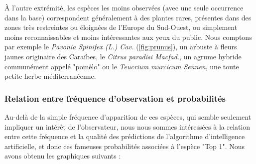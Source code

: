 \documentclass[a4paper,12pt]{article}
\begin{document}
\vspace{0.2cm}

À l'autre extrémité, les espèces les moins observées (avec une seule occurrence dans la base) correspondent généralement à des plantes rares, présentes dans des zones très restreintes ou éloignées de l'Europe du Sud-Ouest, ou simplement moins reconnaissables et moins intéressantes aux yeux du public. Nous comptons par exemple le \textit{Pavonia Spinifex (L.) Cav.} (\autoref{fig:prunus}), un arbuste à fleurs jaunes originaire des Caraïbes, le \textit{Citrus paradisi Macfad.}, un agrume hybride communément appelé "pomélo" ou le \textit{Teucrium murcicum Sennen}, une toute petite herbe méditerranéenne.

\subsubsection{Relation entre fréquence d'observation et probabilités}

Au-delà de la simple fréquence d'apparition de ces espèces, qui semble seulement impliquer un intérêt de l'observateur, nous nous sommes intéressées à la relation entre cette fréquence et la qualité des prédictions de l'algorithme d'intelligence artificielle, et donc ces fameuses probabilités associées à l'espèce "Top 1".  Nous avons obtenu les graphiques suivants :
\end{document}
